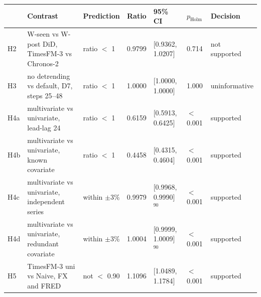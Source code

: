 \begin{tabular}{lllrlll}
\toprule
 & Contrast & Prediction & Ratio & 95\% CI & $p_{\mathrm{Holm}}$ & Decision \\
\midrule
H2 & W-seen vs W-post DiD, TimesFM-3 vs Chronos-2 & ratio $<$ 1 & 0.9799 & [0.9362, 1.0207] & 0.714 & not supported \\
H3 & no detrending vs default, D7, steps 25--48 & ratio $<$ 1 & 1.0000 & [1.0000, 1.0000] & 1.000 & uninformative \\
H4a & multivariate vs univariate, lead-lag 24 & ratio $<$ 1 & 0.6159 & [0.5913, 0.6425] & $<$0.001 & supported \\
H4b & multivariate vs univariate, known covariate & ratio $<$ 1 & 0.4458 & [0.4315, 0.4604] & $<$0.001 & supported \\
H4c & multivariate vs univariate, independent series & within $\pm$3\% & 0.9979 & [0.9968, 0.9990]$^{90}$ & $<$0.001 & supported \\
H4d & multivariate vs univariate, redundant covariate & within $\pm$3\% & 1.0004 & [0.9999, 1.0009]$^{90}$ & $<$0.001 & supported \\
H5 & TimesFM-3 uni vs Naive, FX and FRED & not $<$ 0.90 & 1.1096 & [1.0489, 1.1784] & $<$0.001 & supported \\
\bottomrule
\end{tabular}

